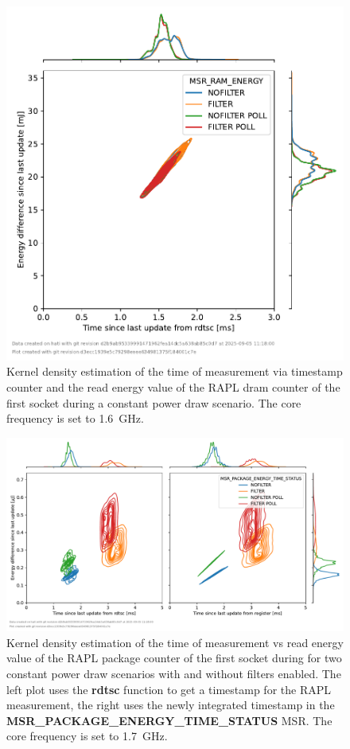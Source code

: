 \begin{figure}[]
    \centering
    \includegraphics[width=0.54\columnwidth]{fig/rapl-update-intervals/MSR_RAM_ENERGY_1600000.pdf}
    \caption{Kernel density estimation of the time of measurement via timestamp counter and the read energy value of the RAPL dram counter of the first socket during a constant power draw scenario.
    The core frequency is set to \SI{1.6}{\GHz}.}
\end{figure}

\clearpage
\begin{figure}[]
    \centering
    \includegraphics[width=\columnwidth]{fig/rapl-update-intervals/MSR_PACKAGE_ENERGY_TIME_STATUS_1700000.pdf}
    \caption{Kernel density estimation of the time of measurement vs read energy value of the RAPL package counter of the first socket during for two constant power draw scenarios with and without filters enabled.
    The left plot uses the \textbf{rdtsc} function to get a timestamp for the RAPL measurement, the right uses the newly integrated timestamp in the \textbf{MSR\_PACKAGE\_ENERGY\_TIME\_STATUS} MSR.
    The core frequency is set to \SI{1.7}{\GHz}.}
\end{figure}

